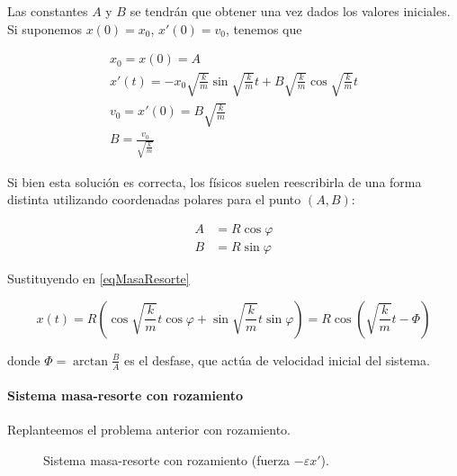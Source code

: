 Las constantes $A$ y $B$ se tendrán que obtener una vez dados los valores iniciales. Si suponemos $x(0) = x_0$, $x'(0) = v_0$, tenemos que

\begin{gather*}
x_0 = x(0) = A \\
x'(t) = -x_0 \sqrt{\frac{k}{m}} \sin \sqrt{\frac{k}{m}} t + B \sqrt{\frac{k}{m}}\cos\sqrt{\frac{k}{m}} t \\
v_0 = x'(0) = B \sqrt{\frac{k}{m}} \\
B = \frac{v_0}{\sqrt{\frac{k}{m}}}
\end{gather*}

Si bien esta solución es correcta, los físicos suelen reescribirla de una forma distinta utilizando coordenadas polares para el punto $(A,B)$:

\begin{align*}
A &= R\cos φ \\
B &= R\sin φ 
\end{align*}

Sustituyendo en \eqref{eqMasaResorte}

\[ x(t) = R\left(\cos \sqrt{\frac{k}{m}} t\cos φ + \sin \sqrt{\frac{k}{m}} t \sin φ \right) = R\cos\left(\sqrt{\frac{k}{m}}t - Φ\right) \]

donde $Φ = \arctan \frac{B}{A}$ es el desfase, que actúa de velocidad inicial del sistema.

\paragraph{Sistema masa-resorte con rozamiento}

Replanteemos el problema anterior con rozamiento.
\begin{figure}
\centering
{}
\caption{Sistema masa-resorte con rozamiento (fuerza $-εx'$).}
\end{figure}

